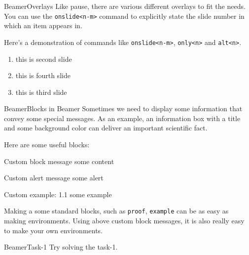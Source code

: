 \begin{frame}{Beamer}{Overlays}
    Like pause, there are various different overlays to fit the needs.
    You can use the \texttt{onslide<n-m>} command to explicitly state the slide
    number in which an item appears in.\vspace{1em}

    Here's a demonstration of commands like  \texttt{onslide<n-m>},
    \texttt{only<n>} and \texttt{alt<n>}. \vspace{1em}

    \begin{enumerate}
         \item this is second slide
         \item this is fourth slide
         \item this is third slide
    \end{enumerate}
\end{frame}

\begin{frame}{Beamer}{Blocks in Beamer}
    \small
    Sometimes we need to display some information that convey some special
    messages. As an example, an information box with a title and some
    background color can deliver an important scientific fact. \vspace{1em}

    Here are some useful blocks: \pause
    \begin{block}{Custom block message}
        some content
    \end{block}
    \pause
    \begin{alertblock}{Custom alert message}
        some alert
    \end{alertblock}
    \pause
    \begin{exampleblock}{Custom example: 1.1}
        some example
    \end{exampleblock}
    \pause
    \footnotesize
    Making a some standard blocks, such as \texttt{proof}, \texttt{example}
    can be as easy as making environments. Using above custom block messages,
    it is also really easy to make your own environments.

\end{frame}


\begin{frame}{Beamer}{Task-1}
    Try solving the task-1.
\end{frame}
